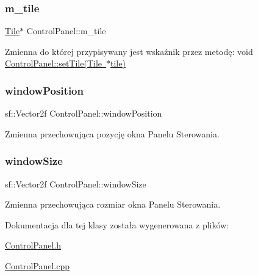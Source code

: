 \subsubsection{\texorpdfstring{m\+\_\+tile}{m\_tile}}
{\footnotesize\ttfamily \mbox{\hyperlink{class_tile}{Tile}}$\ast$ Control\+Panel\+::m\+\_\+tile\hspace{0.3cm}{\ttfamily [private]}}

Zmienna do której przypisywany jest wskaźnik przez metodę\+: void \mbox{\hyperlink{class_control_panel_a76244d427bb5a852b55c1d0e79e363de}{Control\+Panel\+::set\+Tile(\+Tile $\ast$tile)}} \mbox{\label{class_control_panel_afef4fad7217719a2dc9df005a40efda0}} 
\subsubsection{\texorpdfstring{window\+Position}{windowPosition}}
{\footnotesize\ttfamily sf\+::\+Vector2f Control\+Panel\+::window\+Position}

Zmienna przechowująca pozycję okna Panelu Sterowania. \mbox{\label{class_control_panel_ac270884ed654aa0c068d551b4653e39c}} 
\subsubsection{\texorpdfstring{window\+Size}{windowSize}}
{\footnotesize\ttfamily sf\+::\+Vector2f Control\+Panel\+::window\+Size}

Zmienna przechowująca rozmiar okna Panelu Sterowania. 

Dokumentacja dla tej klasy została wygenerowana z plików\+:\begin{DoxyCompactItemize}
\item 
\mbox{\hyperlink{_control_panel_8h}{Control\+Panel.\+h}}\item 
\mbox{\hyperlink{_control_panel_8cpp}{Control\+Panel.\+cpp}}\end{DoxyCompactItemize}
